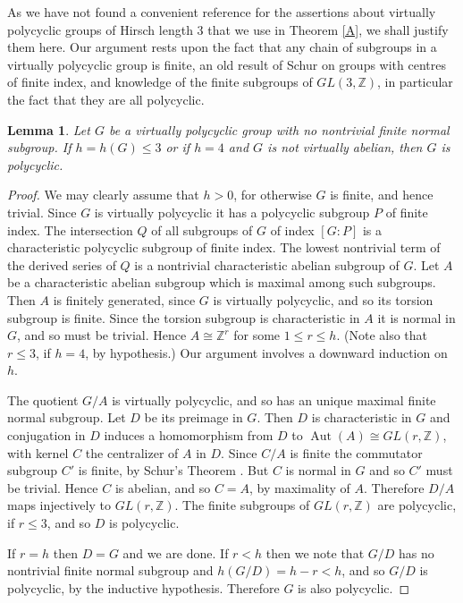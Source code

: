 \documentclass[12pt]{amsart}
\renewcommand{\leq}{\leqslant}
\newtheorem{lemma}[theorem]{Lemma}
\theoremstyle{definition}
\DeclareMathOperator{\Aut}{Aut}
\begin{document}
As we have not found a convenient reference for the assertions 
about virtually polycyclic groups of Hirsch length 3 that we use in Theorem \ref{A}, 
we shall justify them here.
Our argument rests upon the fact that 
any chain of subgroups in a virtually polycyclic group is finite, 
an old result of Schur on groups with centres of finite index,
and knowledge of the finite subgroups of $GL(3,\mathbb{Z})$, 
in particular the fact that they are all polycyclic.   

\begin{lemma}
\label{NNTFN}
Let $G$ be a virtually polycyclic group with no nontrivial finite normal subgroup.
If $h=h(G)\leq3$ or if $h=4$ and $G$ is not virtually abelian,
then $G$ is polycyclic.
\end{lemma}

\begin{proof}
We may clearly assume that $h>0$, for otherwise $G$ is finite, 
and hence trivial.
Since $G$ is virtually polycyclic it has a polycyclic subgroup $P$ of finite index.
The intersection $Q$ of all subgroups of $G$ of index $[G:P]$ is a characteristic polycyclic subgroup of finite index.
The lowest nontrivial term of the derived series of $Q$
is a nontrivial characteristic abelian subgroup of $G$.
Let $A$ be a characteristic abelian subgroup which is maximal among such subgroups.
Then $A$ is finitely generated, since $G$ is virtually polycyclic, 
and so its torsion subgroup is finite.
Since the torsion subgroup is characteristic in $A$ it is normal in $G$,
and so must be trivial.
Hence $A\cong\mathbb{Z}^r$ for some $1\leq{r}\leq{h}$.
(Note also that $r\leq3$, if $h=4$, by hypothesis.) 
Our argument involves a downward induction on $h$.

The quotient $G/A$ is virtually polycyclic,
and so has an unique maximal finite normal subgroup.
Let $D$ be its preimage in $G$.
Then $D$ is characteristic in $G$ and conjugation in $D$ 
induces a homomorphism from $D$ to $\Aut(A)\cong{GL(r,\mathbb{Z})}$, 
with kernel $C$ the centralizer of $A$ in $D$.
Since $C/A$ is finite the commutator subgroup $C'$ is finite,
by Schur's Theorem \cite[10.1.4]{Ro}.
But $C$ is normal in $G$ and so $C'$ must be trivial.
Hence $C$ is abelian, and so $C=A$, by maximality of $A$. 
Therefore $D/A$ maps injectively to $GL(r,\mathbb{Z})$.
The finite subgroups of $GL(r,\mathbb{Z})$ are polycyclic, if $r\leq3$,
and so $D$ is polycyclic.

If $r=h$ then $D=G$ and we are done.
If $r<h$ then we note that $G/D$ has no nontrivial finite normal subgroup 
and $h(G/D)=h-r<h$, and so $G/D$ is polycyclic, by the inductive hypothesis.
Therefore $G$ is also polycyclic.
\end{proof}
\end{document}
